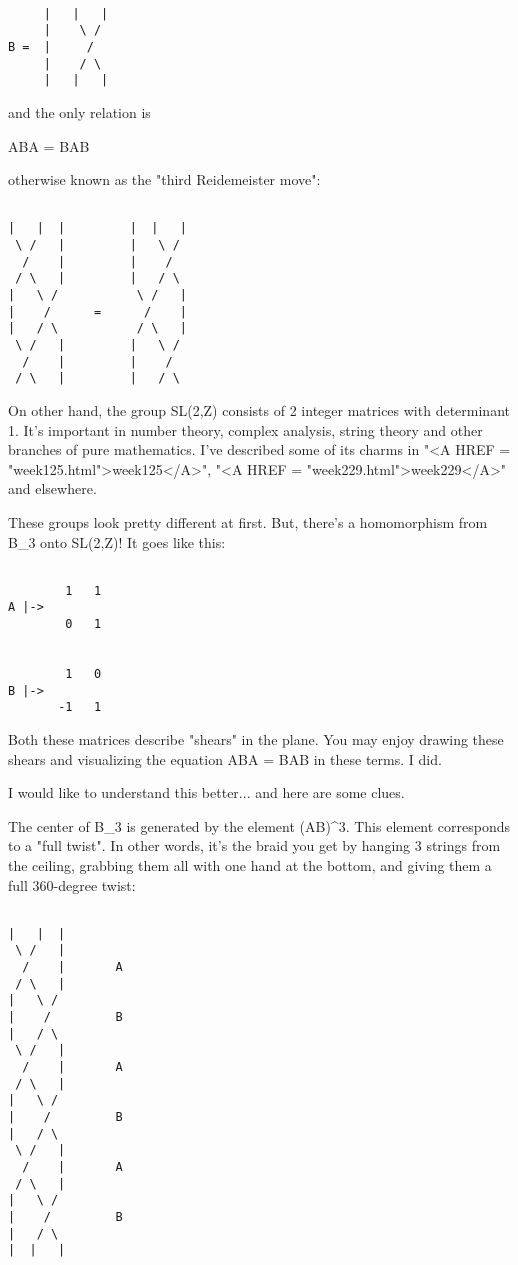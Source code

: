 \begin{verbatim}

     |   |   |   
     |    \ /    
B =  |     /    
     |    / \  
     |   |   |
\end{verbatim}
    
and the only relation is

ABA = BAB

otherwise known as the "third Reidemeister move":


\begin{verbatim}

|   |  |         |  |   | 
 \ /   |         |   \ /
  /    |         |    / 
 / \   |         |   / \
|   \ /           \ /   |  
|    /      =      /    | 
|   / \           / \   | 
 \ /   |         |   \ / 
  /    |         |    /
 / \   |         |   / \  
\end{verbatim}
    
On other hand, the group SL(2,Z) consists of 2 integer matrices with
determinant 1.  It's important in number theory, complex analysis,
string theory and other branches of pure mathematics.  I've described
some of its charms in "<A HREF =
"week125.html">week125</A>", "<A HREF =
"week229.html">week229</A>" and elsewhere.

These groups look pretty different at first.  But, there's a 
homomorphism from B_{3} onto SL(2,Z)!  It goes like this:


\begin{verbatim}

        1   1
A |->  
        0   1


        1   0
B |->  
       -1   1
\end{verbatim}
    

Both these matrices describe "shears" in the plane.  
You may enjoy drawing these shears and visualizing the equation 
ABA = BAB in these terms.  I did.

I would like to understand this better... and here are some clues.

The center of B_{3} is generated by the element (AB)^{3}.  
This element corresponds to a "full twist".  In other words, it's
the braid you get by hanging 3 strings from the ceiling, grabbing 
them all with one hand at the bottom, and giving them a full 360-degree 
twist:


\begin{verbatim}

|   |  |  
 \ /   | 
  /    |       A
 / \   |
|   \ /    
|    /         B 
|   / \   
 \ /   | 
  /    |       A
 / \   |
|   \ /    
|    /         B 
|   / \   
 \ /   | 
  /    |       A
 / \   |
|   \ /    
|    /         B 
|   / \   
|  |   |
\end{verbatim}
    
